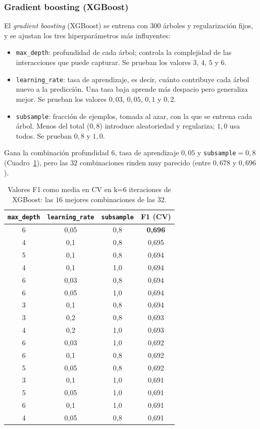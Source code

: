 \documentclass[12pt,a4paper]{report}
\theoremstyle{definition}
\newcommand{\tc}[1]{\texttt{#1}}
\begin{document}
\subsubsection{Gradient boosting (XGBoost)}

El \emph{gradient boosting} (XGBoost) se entrena con $300$ árboles y regularización fijos, y se ajustan
los tres hiperparámetros más influyentes:

\begin{itemize}
\item \tc{max\_depth}: profundidad de cada árbol; controla la complejidad de las interacciones
que puede capturar. Se prueban los valores $3$, $4$, $5$ y $6$.
\item \tc{learning\_rate}: tasa de aprendizaje, es decir, cuánto contribuye cada árbol nuevo a
la predicción. Una tasa baja aprende más despacio pero generaliza mejor. Se prueban los
valores $0{,}03$, $0{,}05$, $0{,}1$ y $0{,}2$.
\item \tc{subsample}: fracción de ejemplos, tomada al azar, con la que se entrena cada árbol.
Menos del total ($0{,}8$) introduce aleatoriedad y regulariza; $1{,}0$ usa todos. Se prueban
$0{,}8$ y $1{,}0$.
\end{itemize}

Gana la combinación profundidad $6$, tasa de aprendizaje $0{,}05$ y \tc{subsample}${}=0{,}8$ (Cuadro~\ref{tab:grid-xgb}), pero las $32$ combinaciones rinden muy parecido (entre $0{,}678$ y $0{,}696$).

\begin{table}[H]
\centering\footnotesize
\begin{tabular}{cccc}
\toprule
\tc{max\_depth} & \tc{learning\_rate} & \tc{subsample} & F1 (CV) \\
\midrule
6 & 0,05 & 0,8 & \textbf{0,696} \\
4 & 0,1 & 0,8 & 0,695 \\
5 & 0,1 & 0,8 & 0,694 \\
4 & 0,1 & 1,0 & 0,694 \\
6 & 0,03 & 0,8 & 0,694 \\
6 & 0,05 & 1,0 & 0,694 \\
3 & 0,1 & 0,8 & 0,694 \\
3 & 0,2 & 0,8 & 0,693 \\
4 & 0,2 & 1,0 & 0,693 \\
6 & 0,03 & 1,0 & 0,692 \\
6 & 0,1 & 0,8 & 0,692 \\
5 & 0,05 & 0,8 & 0,692 \\
3 & 0,1 & 1,0 & 0,691 \\
5 & 0,05 & 1,0 & 0,691 \\
6 & 0,1 & 1,0 & 0,691 \\
4 & 0,05 & 0,8 & 0,691 \\
\bottomrule
\end{tabular}
\caption{Valores F1 como media en CV en k=6 iteraciones de XGBoost: las $16$ mejores combinaciones de
las $32$.}
\label{tab:grid-xgb}
\end{table}
\end{document}
